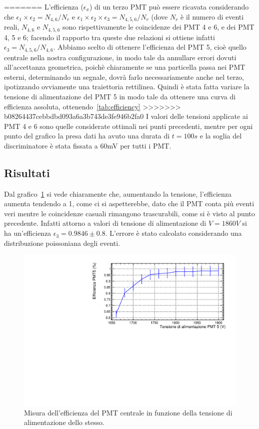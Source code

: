 \documentclass[a4paper,10pt]{article}
\begin{document}
=======
L'efficienza ($\epsilon_x$) di un terzo PMT può essere ricavata considerando che $\epsilon_1\times \epsilon_2=N_{4,6}/N_r$ e $\epsilon_1\times\epsilon_2\times \epsilon_3=N_{4,5,6}/N_r$ (dove $N_r$ è il numero di eventi reali, $N_{4,6}$ e $N_{4,5,6}$ sono rispettivamente le coincidenze dei PMT 4 e 6, e dei PMT 4, 5 e 6; facendo il rapporto tra queste due relazioni si ottiene infatti $\epsilon_3=N_{4,5,6}/N_{4,6}$. Abbiamo scelto di ottenere l'efficienza del PMT 5, cioè quello centrale nella nostra configurazione, in modo tale da annullare errori dovuti all'accettanza geometrica, poichè chiaramente se una particella passa nei PMT esterni, determinando un segnale, dovrà farlo necessariamente anche nel terzo, ipotizzando ovviamente una traiettoria rettilinea. Quindi è stata fatta variare la tensione di alimentazione del PMT 5 in modo tale da ottenere una curva di efficienza assoluta, ottenendo~\ref{tab:efficiency}
>>>>>>> b08264437cebbdbd093a6a3b743de3fe946b2fa0
I valori delle tensioni applicate ai PMT 4 e 6 sono quelle considerate ottimali nei punti precedenti, mentre per ogni punto del grafico la presa dati ha avuto una durata di $t=100s$ e la soglia del discriminatore è stata fissata a 60mV per tutti i PMT.
\subsection{Risultati}
Dal grafico~\ref{fig:efficiency} si vede chiaramente che, aumentando la tensione, l'efficienza aumenta tendendo a 1, come ci si aspetterebbe, dato che il PMT conta più eventi veri mentre le coincidenze casuali rimangono trascurabili, come si è visto al punto precedente. Infatti attorno a valori di tensione di alimentazione di $V=1860V$ si ha un'efficienza $\epsilon_3=0.9846\pm0.8$. L'errore è stato calcolato considerando una distribuzione poissoniana degli eventi.

\begin{figure}
	\centering
	\includegraphics[width=\textwidth]{fig/efficiency}
	\caption{Misura dell'efficienza del PMT centrale in funzione della tensione di alimentazione dello stesso.}
	\label{fig:efficiency}
\end{figure}

\label{sec:efficienza} 


\end{document}
